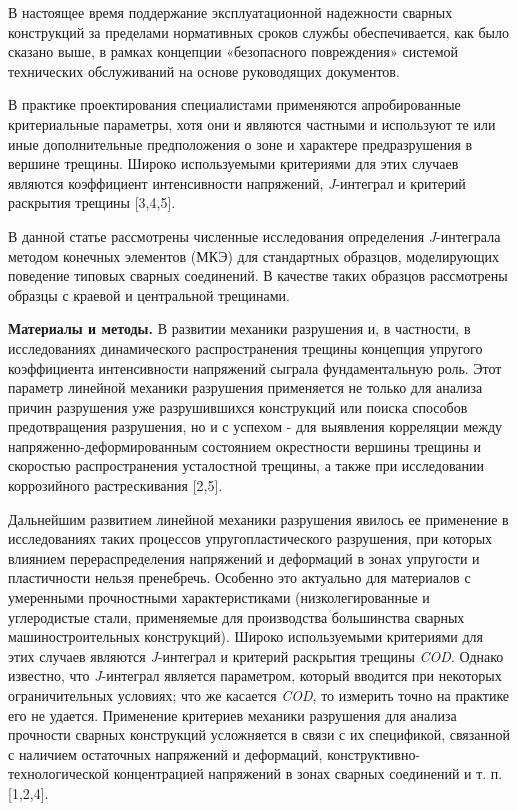 В настоящее время поддержание эксплуатационной надежности сварных
конструкций за пределами нормативных сроков службы обеспечивается, как
было сказано выше, в рамках концепции «безопасного повреждения» системой
технических обслуживаний на основе руководящих документов.

В практике проектирования специалистами применяются апробированные
критериальные параметры, хотя они и являются частными и используют те
или иные дополнительные предположения о зоне и характере предразрушения
в вершине трещины. Широко используемыми критериями для этих случаев
являются коэффициент интенсивности напряжений, \emph{J}-интеграл и
критерий раскрытия трещины {[}3,4,5{]}.

В данной статье рассмотрены численные исследования определения
\emph{J}-интеграла методом конечных элементов (МКЭ) для стандартных
образцов, моделирующих поведение типовых сварных соединений. В качестве
таких образцов рассмотрены образцы с краевой и центральной трещинами.

{\bfseries Материалы и методы.} В развитии механики разрушения и, в
частности, в исследованиях динамического распространения трещины
концепция упругого коэффициента интенсивности напряжений сыграла
фундаментальную роль. Этот параметр линейной механики разрушения
применяется не только для анализа причин разрушения уже разрушившихся
конструкций или поиска способов предотвращения разрушения, но и с
успехом - для выявления корреляции между напряженно-деформированным
состоянием окрестности вершины трещины и скоростью распространения
усталостной трещины, а также при исследовании коррозийного
растрескивания {[}2,5{]}.

Дальнейшим развитием линейной механики разрушения явилось ее применение
в исследованиях таких процессов упругопластического разрушения, при
которых влиянием перераспределения напряжений и деформаций в зонах
упругости и пластичности нельзя пренебречь. Особенно это актуально для
материалов с умеренными прочностными характеристиками (низколегированные
и углеродистые стали, применяемые для производства большинства сварных
машиностроительных конструкций). Широко используемыми критериями для
этих случаев являются \emph{J}-интеграл и критерий раскрытия трещины
\emph{COD}. Однако известно, что \emph{J}-интеграл является параметром,
который вводится при некоторых ограничительных условиях; что же касается
\emph{COD}, то измерить точно на практике его не удается. Применение
критериев механики разрушения для анализа прочности сварных конструкций
усложняется в связи с их спецификой, связанной с наличием остаточных
напряжений и деформаций, конструктивно-технологической концентрацией
напряжений в зонах сварных соединений и т. п. {[}1,2,4{]}.

